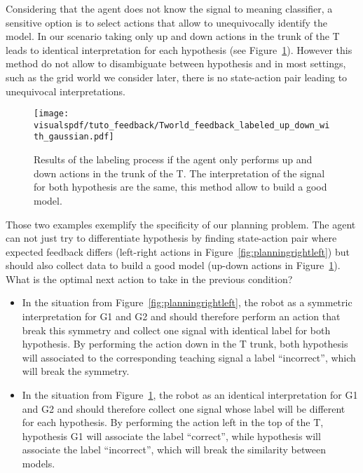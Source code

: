 Considering that the agent does not know the signal to meaning classifier, a sensitive option is to select actions that allow to unequivocally identify the model. In our scenario taking only up and down actions in the trunk of the T leads to identical interpretation for each hypothesis (see Figure~\ref{fig:planningupdown}). However this method do not allow to disambiguate between hypothesis and in most settings, such as the grid world we consider later, there is no state-action pair leading to unequivocal interpretations.

\begin{figure}[!ht]
  \centering
  \texttt{[image: \\visualspdf/tuto\_feedback/Tworld\_feedback\_labeled\_up\_down\_with\_gaussian.pdf]}
  \caption{Results of the labeling process if the agent only performs up and down actions in the trunk of the T. The interpretation of the signal for both hypothesis are the same, this method allow to build a good model.}
  \label{fig:planningupdown}
\end{figure}

Those two examples exemplify the specificity of our planning problem. The agent can not just try to differentiate hypothesis by finding state-action pair where expected feedback differs (left-right actions in Figure~\ref{fig:planningrightleft}) but should also collect data to build a good model (up-down actions in Figure~\ref{fig:planningupdown}). What is the optimal next action to take in the previous condition?

\begin{itemize}
\item In the situation from Figure~\ref{fig:planningrightleft}, the robot as a symmetric interpretation for G1 and G2 and should therefore perform an action that break this symmetry and collect one signal with identical label for both hypothesis. By performing the action down in the T trunk, both hypothesis will associated to the corresponding teaching signal a label ``incorrect'', which will break the symmetry.
\item In the situation from Figure~\ref{fig:planningupdown}, the robot as an identical interpretation for G1 and G2 and should therefore collect one signal whose label will be different for each hypothesis. By performing the action left in the top of the T, hypothesis G1 will associate the label ``correct'', while hypothesis will associate the label ``incorrect'', which will break the similarity between models.
\end{itemize}

